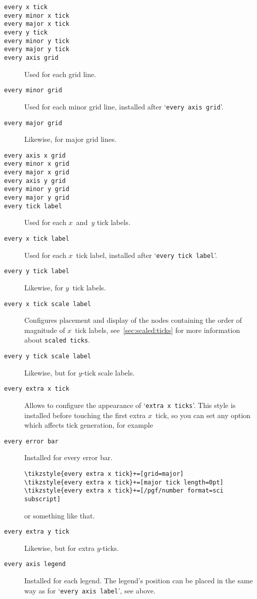 \begin{description}
\item[\texttt{every x tick}]
\item[\texttt{every minor x tick}]
\item[\texttt{every major x tick}]
\item[\texttt{every y tick}]
\item[\texttt{every minor y tick}]
\item[\texttt{every major y tick}]
\item[\texttt{every axis grid}] Used for each grid line.
\item[\texttt{every minor grid}] Used for each minor grid line, installed after `\texttt{every axis grid}'.
\item[\texttt{every major grid}] Likewise, for major grid lines.
\item[\texttt{every axis x grid}]
\item[\texttt{every minor x grid}]
\item[\texttt{every major x grid}]
\item[\texttt{every axis y grid}]
\item[\texttt{every minor y grid}]
\item[\texttt{every major y grid}]
\item[\texttt{every tick label}] Used for each $x$~and~$y$ tick labels.
\item[\texttt{every x tick label}] Used for each $x$~tick label, installed after `\texttt{every tick label}'.
\item[\texttt{every y tick label}] Likewise, for $y$~tick labels.
\item[\texttt{every x tick scale label}] Configures placement and display of the nodes containing the order of magnitude of $x$~tick labels, see~\ref{sec:scaled:ticks} for more information about \texttt{scaled ticks}.
\item[\texttt{every y tick scale label}] Likewise, but for $y$-tick scale labels.
\item[\texttt{every extra x tick}] Allows to configure the appearance of `\texttt{extra x ticks}'. This style is installed before touching the first extra $x$~tick, so you can set any option which affects tick generation, for example
\item[\texttt{every error bar}] Installed for every error bar.
\begin{lstlisting}
\tikzstyle{every extra x tick}+=[grid=major]
\tikzstyle{every extra x tick}+=[major tick length=0pt]
\tikzstyle{every extra x tick}+=[/pgf/number format=sci subscript]
\end{lstlisting}
or something like that.
\item[\texttt{every extra y tick}] Likewise, but for extra $y$-ticks.
\item[\texttt{every axis legend}] Installed for each legend. The legend's position can be placed in the same way as for `\texttt{every axis label}', see above.
\end{description}

